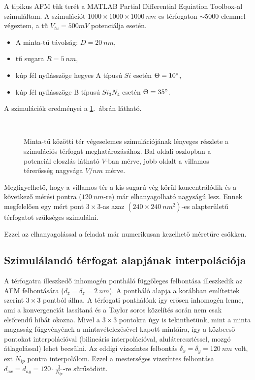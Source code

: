 	A tipikus AFM tűk terét a MATLAB Partial Differential Equiation Toolbox-al szimuláltam.
	A szimulációt $1000\times 1000\times 1000\ nm$-es térfogaton $\sim5000$ elemmel végeztem, a tű $V_{tu} = 500mV$ potenciálja
	esetén.
	\begin{itemize}
	  \item A minta-tű távolság: $D=20\ nm$,
	  \item tű sugara $R=5\ nm$,
	  \item kúp fél nyílásszöge hegyes A típusú $Si$ esetén $\Theta=10\degree$,
	  \item kúp fél nyílásszöge B típusú $Si_3N_4$ esetén $\Theta=35\degree$.
	\end{itemize}
	A szimulációk eredményei a \ref{fig:pde_sim}.~ábrán látható.
	\newpage
	\begin{figure}[ht]
		\hfil
		\\
		\hfil
		
		\caption{
			Minta-tű közötti tér végeselemes szimulációjának lényeges részlete a szimulációs térfogat meghatározásához.
			Bal oldali oszlopban a potenciál eloszlás látható $V$-ban mérve, jobb oldalt a villamos térerősség nagysága $V/nm$ mérve.
		}
		\label{fig:pde_sim}
	\end{figure}
		
	Megfigyelhető, hogy a villamos tér a kis-sugarú vég körül koncentrálódik és a következő mérési pontra ($120\ nm$-re) már
	elhanyagolható nagyságú lesz. Ennek megfelelően egy mért pont $3\times3$-as azaz $(240\times240\ nm^2)$-es alapterületű
	térfogatot szükséges szimulálni.
	\begin{center}
		Ezzel az elhanyagolással a feladat már numerikusan kezelhető méretűre csökken.
	\end{center}
	
\subsection{Szimulálandó térfogat alapjának interpolációja}	
	A térfogatra illeszkedő inhomogén pontháló függőleges felbontása illeszkedik az AFM felbontására ($d_z=\delta_z = 2\ nm$).
	A pontháló alapja a korábban említettek szerint $3\times3$ pontból állna.
	A térfogati ponthálónk így erősen inhomogén lenne, ami a konvergenciát lassítaná és a Taylor soros közelítés során nem csak
	elsőrendű hibát okozna.
	Mivel a $3\times3$ pontokra úgy is tekinthetünk, mint a minta magasság-függvényének a mintavételezésével
	kapott mintáira, így a közbeeső pontokat interpolációval (bilineáris interpolációval, aluláteresztéssel, mozgó átlagolással)
	lehet becsülni.
	Az eddigi vizszíntes felbontás $\delta_x = \delta_y = 120\ nm$ volt, ezt $N_{ip}$ pontra interpolálom.
	Ezzel a mesterséges vizszíntes felbontása $d_{ax} = d_{ay} = 120\cdot\frac{3}{N_{ip}}$-re sűrűsödött. 
	
